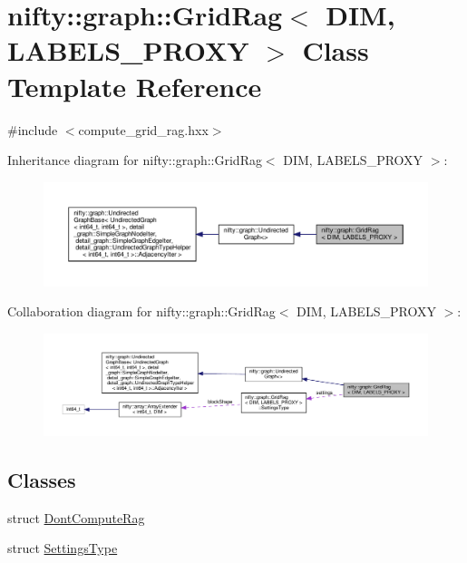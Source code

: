 \hypertarget{classnifty_1_1graph_1_1GridRag}{}\section{nifty\+:\+:graph\+:\+:Grid\+Rag$<$ D\+IM, L\+A\+B\+E\+L\+S\+\_\+\+P\+R\+O\+XY $>$ Class Template Reference}
\label{classnifty_1_1graph_1_1GridRag}


{\ttfamily \#include $<$compute\+\_\+grid\+\_\+rag.\+hxx$>$}



Inheritance diagram for nifty\+:\+:graph\+:\+:Grid\+Rag$<$ D\+IM, L\+A\+B\+E\+L\+S\+\_\+\+P\+R\+O\+XY $>$\+:
\nopagebreak
\begin{figure}[H]
\begin{center}
\leavevmode
\includegraphics[width=350pt]{classnifty_1_1graph_1_1GridRag__inherit__graph}
\end{center}
\end{figure}


Collaboration diagram for nifty\+:\+:graph\+:\+:Grid\+Rag$<$ D\+IM, L\+A\+B\+E\+L\+S\+\_\+\+P\+R\+O\+XY $>$\+:
\nopagebreak
\begin{figure}[H]
\begin{center}
\leavevmode
\includegraphics[width=350pt]{classnifty_1_1graph_1_1GridRag__coll__graph}
\end{center}
\end{figure}
\subsection*{Classes}
\begin{DoxyCompactItemize}
\item 
struct \hyperlink{structnifty_1_1graph_1_1GridRag_1_1DontComputeRag}{Dont\+Compute\+Rag}
\item 
struct \hyperlink{structnifty_1_1graph_1_1GridRag_1_1SettingsType}{Settings\+Type}
\end{DoxyCompactItemize}
